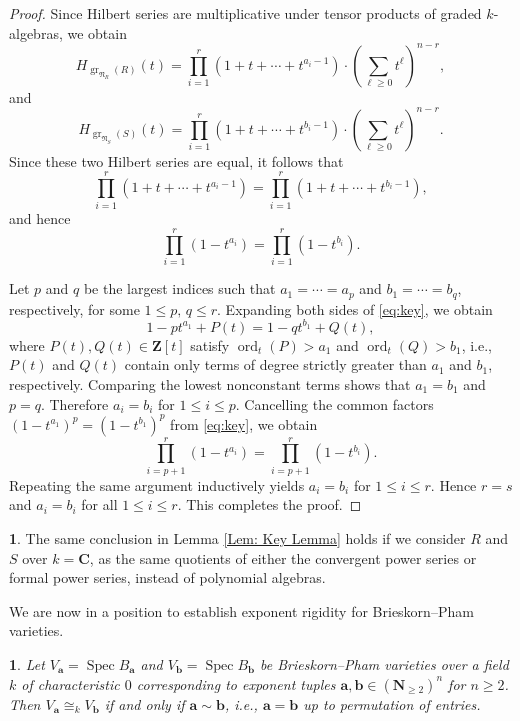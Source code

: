\documentclass[english,10pt,reqno,twoside]{amsart}
\numberwithin{equation}{section}
\numberwithin{figure}{section}
\theoremstyle{plain}
\newtheorem{thm}{\protect\theoremname}
\theoremstyle{plain}
\theoremstyle{definition}
\newtheorem{rem}{\protect\remarkname}
\providecommand{\theoremname}{Theorem}
\providecommand{\remarkname}{Remark}
\theoremstyle{plain}
\numberwithin{equation}{section}
\newcommand{\C}{\mathbf{C}}
\newcommand{\N}{\mathbf{N}}
\newcommand{\Z}{\mathbf{Z}}
\newcommand{\ba}{\mathbf{a}}
\newcommand{\bb}{\mathbf{b}}
\newcommand{\Spec}{\operatorname{Spec}}
\begin{document}
\begin{proof}
Since Hilbert series are multiplicative under tensor products of graded $k$-algebras, we obtain
\[
H_{\operatorname{gr}_{\mathfrak{N}_R}(R)}(t)
=
\prod_{i=1}^{r}
(1+t+\cdots+t^{a_i-1})
\cdot
\left(\sum_{\ell\geq 0} t^\ell\right)^{n-r},
\]
and
\[
H_{\operatorname{gr}_{\mathfrak{N}_S}(S)}(t)
=
\prod_{i=1}^{r}
(1+t+\cdots+t^{b_i-1})
\cdot
\left(\sum_{\ell\geq 0} t^\ell\right)^{n-r}.
\]
Since these two Hilbert series are equal, it follows that
\[
\prod_{i=1}^{r}
(1+t+\cdots+t^{a_i-1})
=
\prod_{i=1}^{r}
(1+t+\cdots+t^{b_i-1}),
\]
and hence
\begin{equation}\label{eq:key}
\prod_{i=1}^{r}(1-t^{a_i})
=
\prod_{i=1}^{r}(1-t^{b_i}).
\end{equation}

Let $p$ and $q$ be the largest indices such that $a_1=\cdots=a_p$ and $b_1=\cdots=b_q$, respectively, for some $1\leq p,\, q\leq r$. Expanding both sides of \eqref{eq:key}, we obtain
\begin{equation}\label{eq:key1}
1-pt^{a_1}+P(t)=1-qt^{b_1}+Q(t),
\end{equation}
where \(P(t),Q(t)\in\Z[t]\) satisfy $\operatorname{ord}_t(P)>a_1$ and $\operatorname{ord}_t(Q)>b_1$, i.e., $P(t)$ and $Q(t)$ contain only terms of degree strictly greater than $a_1$ and $b_1$, respectively. Comparing the lowest nonconstant terms shows that $a_1=b_1$ and $p=q$. Therefore $a_i=b_i$ for $1\leq i\leq p$. Cancelling the common factors \((1-t^{a_1})^p=(1-t^{b_1})^p\) from \eqref{eq:key}, we obtain
\begin{equation}\label{eq:key2}
\prod_{i=p+1}^{r}(1-t^{a_i})
=
\prod_{i=p+1}^{r}(1-t^{b_i}).
\end{equation}
Repeating the same argument inductively yields $a_i=b_i$ for $1\leq i\leq r$. Hence $r=s$ and $a_i=b_i$ for all $1\leq i\leq r$. This completes the proof.
\end{proof}

\begin{rem}\label{Rem 1}
    The same conclusion in Lemma \ref{Lem: Key Lemma} holds if we consider $R$ and $S$ over $k=\C$, as the same quotients of either the convergent power series or formal power series, instead of polynomial algebras.
\end{rem}

We are now in a position to establish exponent rigidity for Brieskorn--Pham varieties.

\begin{thm}\label{Thm: Exponent rigidity of B-P variety}
    Let $V_\ba=\Spec B_\ba$ and $V_\bb=\Spec B_\bb$ be Brieskorn--Pham varieties over a field $k$ of characteristic $0$ corresponding to exponent tuples $\ba,\bb\in(\N_{\ge2})^n$ for $n\geq 2$. Then $V_\ba\cong_k V_\bb$ if and only if $\ba\sim \bb$, i.e., $\ba=\bb$ up to permutation of entries.
\end{thm}
\end{document}
